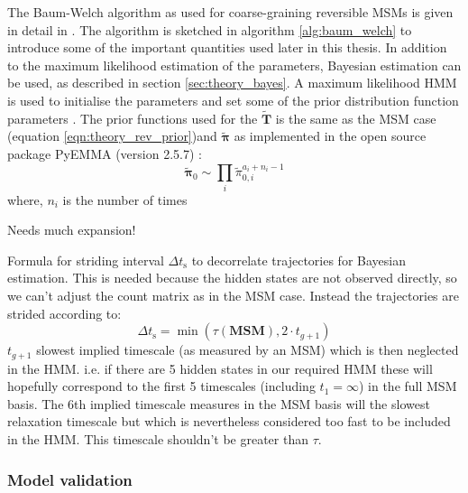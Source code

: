The Baum-Welch algorithm as used for coarse-graining reversible MSMs is given in detail in \cite{noeProjectedHiddenMarkov2013a}. The algorithm is sketched in algorithm \ref{alg:baum_welch} to introduce some of the important quantities used later in this thesis. In addition to the maximum likelihood estimation of the parameters, Bayesian estimation can be used, as described in section \ref{sec:theory_bayes}. A maximum likelihood HMM is used to initialise the parameters and set some of the prior distribution function parameters \cite{choderaBayesianHiddenMarkov2011a}. The prior functions used for the $\widetilde{\mathbf{T}}$ is the same as the MSM case (equation \ref{eqn:theory_rev_prior})and $\widetilde{\bm{\pi}}$ as implemented in the open source package PyEMMA (version 2.5.7) \cite{schererPyEMMASoftwarePackage2015a}:
\begin{equation}
    \widetilde{\bm{\pi}}_{0}  \sim \prod_{i} \widetilde{\pi}_{0, i}^{a_{i}+n_{i}-1} 
\end{equation}
where, $n_{i}$ is the number of times 



Needs much expansion!

Formula for striding interval $\Delta t_{\mathrm{s}}$ to decorrelate trajectories for Bayesian estimation. This is needed because the hidden states are not observed directly, so we can't adjust the count matrix as in the MSM case. Instead the trajectories are strided according to: 
\begin{equation}\label{eqn:hmm_striding}
    \Delta t_{\mathrm{s}} = \min{\left(\tau(\mathbf{MSM}), 2\cdot t_{g+1}\right)}
\end{equation}
$t_{g+1}$ slowest implied timescale (as measured by an MSM) which is then neglected in the HMM. i.e. if there are 5 hidden states in our required HMM these will hopefully correspond to the first 5 timescales (including $t_{1}=\infty$) in the full MSM basis. The 6th implied timescale measures in the MSM basis will the slowest relaxation timescale but which is nevertheless considered too fast to be included in the HMM. This timescale shouldn't be greater than $\tau$. 





\subsubsection{Model validation}\label{sec:model_validation}

